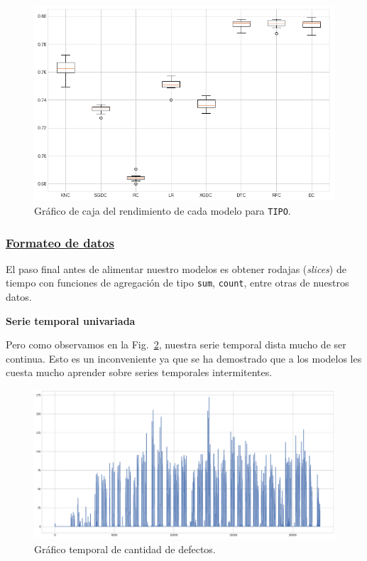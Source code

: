 \documentclass[a4paper,12pt]{article}
\begin{document}
\begin{figure}[H]
	\begin{center}
	\includegraphics[width=1\textwidth]{tesis_72.png}
  	\caption{Gráfico de caja del rendimiento de cada modelo para \texttt{TIPO}.}
  	\label{fig:perfmodeluet}
  	\end{center}
\end{figure}

\subsubsection{\href{https://github.com/GeraCollante/tesis-icomp-machinelearning/blob/main/DataFormatting.ipynb}{\color{blue}Formateo de datos}}

El paso final antes de alimentar nuestro modelos es obtener rodajas (\textit{slices}) de tiempo con funciones de agregación de tipo \texttt{sum}, \texttt{count}, entre otras de nuestros datos. 

\hfill

\textbf{Serie temporal univariada}

Pero como observamos en la Fig.~\ref{fig:graf_cantdef_antes}, nuestra serie temporal dista mucho de ser continua. Esto es un inconveniente ya que se ha demostrado que a los modelos les cuesta mucho aprender sobre series temporales intermitentes.

\begin{figure}[H]
	\begin{center}
	\includegraphics[width=1\textwidth]{tesis_78.png}
  	\caption{Gráfico temporal de cantidad de defectos.}
  	\label{fig:graf_cantdef_antes}
  	\end{center}
\end{figure}
\end{document}
